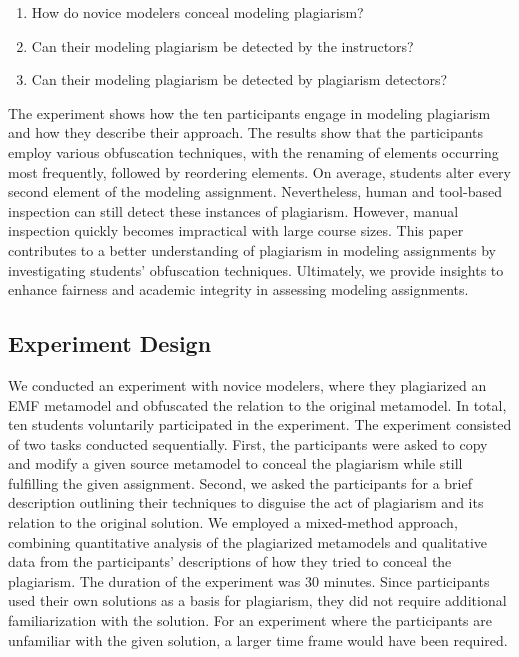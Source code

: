\begin{enumerate}%
    \item How do novice modelers conceal modeling plagiarism?
    \item Can their modeling plagiarism be detected by the instructors?
    \item Can their modeling plagiarism be detected by plagiarism detectors?
\end{enumerate}

\noindent
The experiment shows how the ten participants engage in modeling plagiarism and how they describe their approach.
%
The results show that the participants employ various obfuscation techniques, with the renaming of elements occurring most frequently, followed by reordering elements.
On average, students alter every second element of the modeling assignment. Nevertheless, human and tool-based inspection can still detect these instances of plagiarism.
However, manual inspection quickly becomes impractical with large course sizes.
This paper contributes to a better understanding of plagiarism in modeling assignments by investigating students' obfuscation techniques.
Ultimately, we provide insights to enhance fairness and academic integrity in assessing modeling assignments.

\subsection{Experiment Design}\label{sec:human-plagiarism-task}

\noindent
We conducted an experiment with novice modelers, where they plagiarized an \ac{EMF} metamodel and obfuscated the relation to the original metamodel.
In total, ten students voluntarily participated in the experiment.
%
The experiment consisted of two tasks conducted sequentially.
First, the participants were asked to copy and modify a given source metamodel to conceal the plagiarism while still fulfilling the given assignment.
Second, we asked the participants for a brief description outlining their techniques to disguise the act of plagiarism and its relation to the original solution.
%
We employed a mixed-method approach, combining quantitative analysis of the plagiarized metamodels and qualitative data from the participants' descriptions of how they tried to conceal the plagiarism. 
%
The duration of the experiment was 30 minutes. 
Since participants used their own solutions as a basis for plagiarism, they did not require additional familiarization with the solution. For an experiment where the participants are unfamiliar with the given solution, a larger time frame would have been required.

